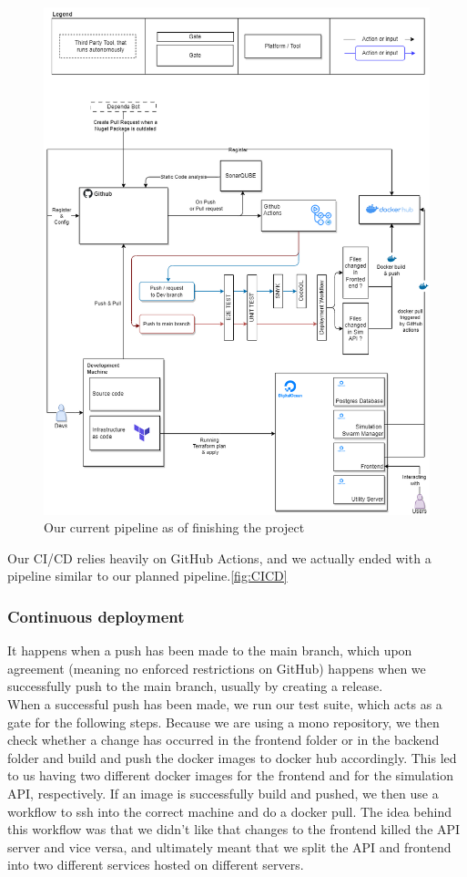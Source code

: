 \begin{figure}[H]
    \centering
    \includegraphics[width=\linewidth]{images/Pipeline.png}
    \caption{Our current pipeline as of finishing the project}
    \label{fig:ci_cd_pipeline}
\end{figure}

Our CI/CD relies heavily on GitHub Actions, and we actually ended with a pipeline similar to our planned pipeline.\ref{fig:CICD}
\subsubsection{Continuous deployment} 
It happens when a push has been made to the main branch, which upon agreement (meaning no enforced restrictions on GitHub) happens when we successfully push to the main branch, usually by creating a release.
\\
When a successful push has been made, we run our test suite, which acts as a gate for the following steps. Because we are using a mono repository, we then check whether a change has occurred in the frontend folder or in the backend folder and build and push the docker images to docker hub accordingly. This led to us having two different docker images for the frontend and for the simulation API, respectively. If an image is successfully build and pushed, we then use a workflow to ssh into the correct machine and do a docker pull. 
The idea behind this workflow was that we didn't like that changes to the frontend killed the API server and vice versa, and ultimately meant that we split the API and frontend into two different services hosted on different servers.
